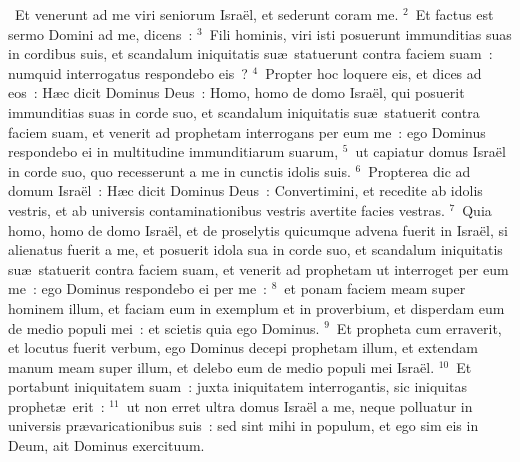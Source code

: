 ~Et venerunt ad me viri seniorum Isra\"el, et sederunt coram me.
${}^{2}$~Et factus est sermo Domini ad me, dicens~:
${}^{3}$~Fili hominis, viri isti posuerunt immunditias suas in cordibus suis, et scandalum iniquitatis su\ae\ statuerunt contra faciem suam~: numquid interrogatus respondebo eis~?
${}^{4}$~Propter hoc loquere eis, et dices ad eos~: H\ae c dicit Dominus Deus~: Homo, homo de domo Isra\"el, qui posuerit immunditias suas in corde suo, et scandalum iniquitatis su\ae\ statuerit contra faciem suam, et venerit ad prophetam interrogans per eum me~: ego Dominus respondebo ei in multitudine immunditiarum suarum,
${}^{5}$~ut capiatur domus Isra\"el in corde suo, quo recesserunt a me in cunctis idolis suis.
${}^{6}$~Propterea dic ad domum Isra\"el~: H\ae c dicit Dominus Deus~: Convertimini, et recedite ab idolis vestris, et ab universis contaminationibus vestris avertite facies vestras.
${}^{7}$~Quia homo, homo de domo Isra\"el, et de proselytis quicumque advena fuerit in Isra\"el, si alienatus fuerit a me, et posuerit idola sua in corde suo, et scandalum iniquitatis su\ae\ statuerit contra faciem suam, et venerit ad prophetam ut interroget per eum me~: ego Dominus respondebo ei per me~:
${}^{8}$~et ponam faciem meam super hominem illum, et faciam eum in exemplum et in proverbium, et disperdam eum de medio populi mei~: et scietis quia ego Dominus.
${}^{9}$~Et propheta cum erraverit, et locutus fuerit verbum, ego Dominus decepi prophetam illum, et extendam manum meam super illum, et delebo eum de medio populi mei Isra\"el.
${}^{10}$~Et portabunt iniquitatem suam~: juxta iniquitatem interrogantis, sic iniquitas prophet\ae\ erit~:
${}^{11}$~ut non erret ultra domus Isra\"el a me, neque polluatur in universis pr\ae varicationibus suis~: sed sint mihi in populum, et ego sim eis in Deum, ait Dominus exercituum.


